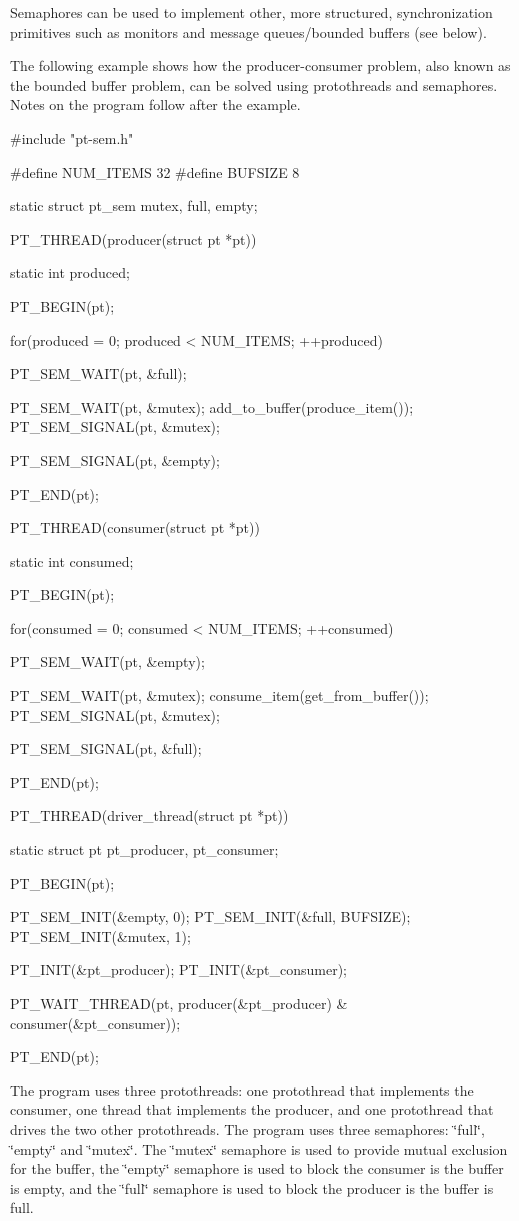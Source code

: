 Semaphores can be used to implement other, more structured, synchronization primitives such as monitors and message queues/bounded buffers (see below).

The following example shows how the producer-\/consumer problem, also known as the bounded buffer problem, can be solved using protothreads and semaphores. Notes on the program follow after the example.


\begin{DoxyCode}
#include "pt-sem.h"

#define NUM_ITEMS 32
#define BUFSIZE 8

static struct pt_sem mutex, full, empty;

PT_THREAD(producer(struct pt *pt))
{
  static int produced;
  
  PT_BEGIN(pt);
  
  for(produced = 0; produced < NUM_ITEMS; ++produced) {
  
    PT_SEM_WAIT(pt, &full);
    
    PT_SEM_WAIT(pt, &mutex);
    add_to_buffer(produce_item());    
    PT_SEM_SIGNAL(pt, &mutex);
    
    PT_SEM_SIGNAL(pt, &empty);
  }

  PT_END(pt);
}

PT_THREAD(consumer(struct pt *pt))
{
  static int consumed;
  
  PT_BEGIN(pt);

  for(consumed = 0; consumed < NUM_ITEMS; ++consumed) {
    
    PT_SEM_WAIT(pt, &empty);
    
    PT_SEM_WAIT(pt, &mutex);    
    consume_item(get_from_buffer());    
    PT_SEM_SIGNAL(pt, &mutex);
    
    PT_SEM_SIGNAL(pt, &full);
  }

  PT_END(pt);
}

PT_THREAD(driver_thread(struct pt *pt))
{
  static struct pt pt_producer, pt_consumer;

  PT_BEGIN(pt);
  
  PT_SEM_INIT(&empty, 0);
  PT_SEM_INIT(&full, BUFSIZE);
  PT_SEM_INIT(&mutex, 1);

  PT_INIT(&pt_producer);
  PT_INIT(&pt_consumer);

  PT_WAIT_THREAD(pt, producer(&pt_producer) &
                     consumer(&pt_consumer));

  PT_END(pt);
}
\end{DoxyCode}


The program uses three protothreads: one protothread that implements the consumer, one thread that implements the producer, and one protothread that drives the two other protothreads. The program uses three semaphores: \char`\"{}full\char`\"{}, \char`\"{}empty\char`\"{} and \char`\"{}mutex\char`\"{}. The \char`\"{}mutex\char`\"{} semaphore is used to provide mutual exclusion for the buffer, the \char`\"{}empty\char`\"{} semaphore is used to block the consumer is the buffer is empty, and the \char`\"{}full\char`\"{} semaphore is used to block the producer is the buffer is full.

